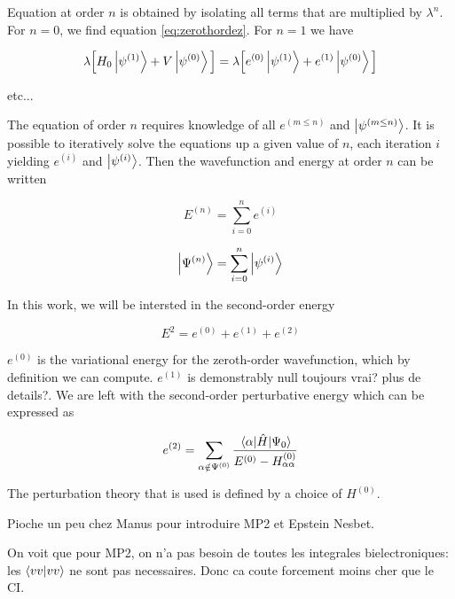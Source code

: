 \documentclass[./thesis.tex]{subfiles}
\begin{document}
Equation at order $n$ is obtained by isolating all terms that are multiplied by $\lambda^n$. For $n=0$, we find equation \ref{eq:zerothordez}. For $n=1$ we have

\begin{equation}
\lambda \Big [ H_0 \ket {\psi^{(1)}} + V \ket {\psi^{(0)}} \Big ] = \lambda \Big [ e^{(0)} \ket {\psi^{(1)}} + e^{(1)} \ket {\psi^{(0)}} \Big ]
\end{equation}

etc...

The equation of order $n$ requires knowledge of all $e^{(m \leq n)}$ and $\ket {\psi^{(m \leq n)}}$. It is possible to iteratively solve the equations up a given value of $n$, each iteration $i$ yielding $e^{(i)}$ and $\ket {\psi^{(i)}}$. Then the wavefunction and energy at order $n$ can be written

\begin{equation}
E^{(n)}=\sum_{i=0}^n e^{(i)}
\end{equation}

\begin{equation}
\ket {\Psi^{(n)}}=\sum_{i=0}^n \ket {\psi^{(i)}}
\end{equation}

In this work, we will be intersted in the second-order energy

\begin{equation}
E^{2} = e^{(0)} + e^{(1)} +e^{(2)}
\end{equation}

$e^{(0)}$ is the variational energy for the zeroth-order wavefunction, which by definition we can compute. $e^{(1)}$ is demonstrably null \alert{toujours vrai? plus de details?}. We are left with the second-order perturbative energy which can be expressed as

\begin{equation}
e^{(2)} = \sum_{\alpha \notin \Psi^{(0)}} \frac{\mel{\alpha}{\hat{H}}{\Psi_0}}{E^{(0)} - H^{(0)}_{\alpha\alpha}}
\end{equation}


The perturbation theory that is used is defined by a choice of $H^{(0)}$.


\alert{Pioche un peu chez Manus pour introduire MP2 et Epstein Nesbet.}



\alert{On voit que pour MP2, on n'a pas besoin de toutes les integrales
bielectroniques: les $\braket{vv}{vv}$ ne sont pas necessaires. Donc ca coute
forcement moins cher que le CI.}
\end{document}
